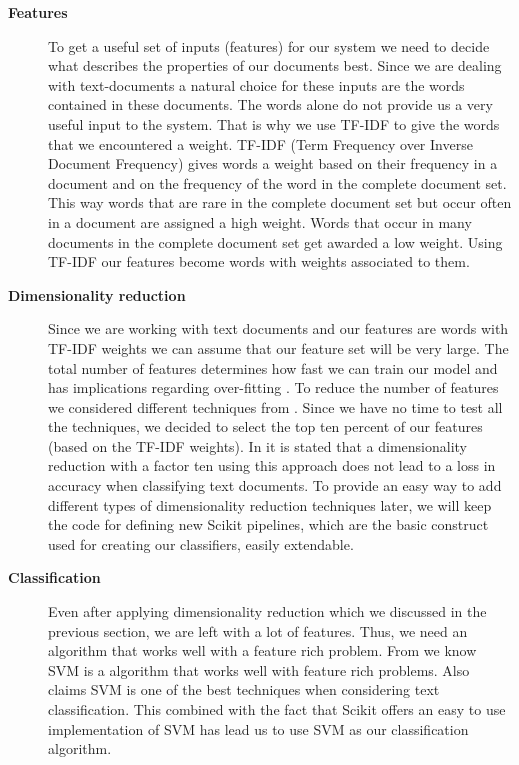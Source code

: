 \begin{description}
\item[\textbf{Features}] 
To get a useful set of inputs (features) for our system we need to decide what describes the properties of our documents best. Since we are dealing with text-documents a natural choice for these inputs are the words contained in these documents. 
The words alone do not provide us a very useful input to the system. That is why we use TF-IDF to give the words that we encountered a weight. TF-IDF (Term Frequency over Inverse Document Frequency) gives words a weight based on their frequency in a document and on the frequency of the word in the complete document set. This way words that are rare in the complete document set but occur often in a document are assigned a high weight. Words that occur in many documents in the complete document set get awarded a low weight\cite{ramos_tfidf}.
Using TF-IDF our features become words with weights associated to them.

\item[\textbf{Dimensionality reduction}]
Since we are working with text documents and our features are words with TF-IDF weights we can assume that our feature set will be very large. The total number of features determines how fast we can train our model and has implications regarding over-fitting \cite{ml_text}. To reduce the number of features we considered different techniques from \cite{ml_text}. Since we have no time to test all the techniques, we decided to select the top ten percent of our features (based on the TF-IDF weights). In \cite{yang1997} it is stated that a dimensionality reduction with a factor ten using this approach does not lead to a loss in accuracy when classifying text documents. To provide an easy way to add different types of dimensionality reduction techniques later, we will keep the code for defining new Scikit pipelines, which are the basic construct used for creating our classifiers,  easily extendable.

\item[\textbf{Classification}]
Even after applying dimensionality reduction which we discussed in the previous section, we are left with a lot of features. Thus, we need an algorithm that works well with a feature rich problem. From \cite{MLCheatSheet} we know SVM is a algorithm that works well with feature rich problems. Also \cite{ml_text} claims SVM is one of the best techniques when considering text classification. This combined with the fact that Scikit offers an easy to use implementation of SVM has lead us to use SVM as our classification algorithm.
\end{description}

